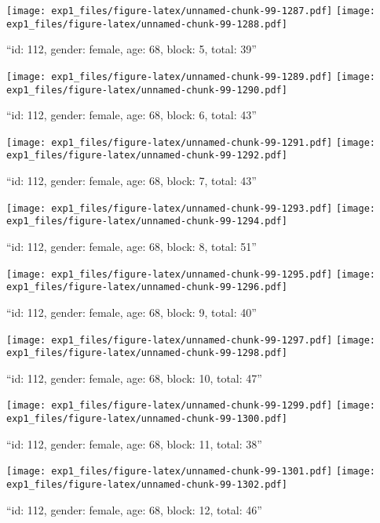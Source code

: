 \documentclass[,]{article}
\begin{document}
\texttt{[image: exp1\_files/figure-latex/unnamed-chunk-99-1287.pdf]}
\texttt{[image: exp1\_files/figure-latex/unnamed-chunk-99-1288.pdf]}

\newpage
[1] 

``id: 112, gender: female, age: 68, block: 5, total: 39''

\texttt{[image: exp1\_files/figure-latex/unnamed-chunk-99-1289.pdf]}
\texttt{[image: exp1\_files/figure-latex/unnamed-chunk-99-1290.pdf]}

\newpage
[1] 

``id: 112, gender: female, age: 68, block: 6, total: 43''

\texttt{[image: exp1\_files/figure-latex/unnamed-chunk-99-1291.pdf]}
\texttt{[image: exp1\_files/figure-latex/unnamed-chunk-99-1292.pdf]}

\newpage
[1] 

``id: 112, gender: female, age: 68, block: 7, total: 43''

\texttt{[image: exp1\_files/figure-latex/unnamed-chunk-99-1293.pdf]}
\texttt{[image: exp1\_files/figure-latex/unnamed-chunk-99-1294.pdf]}

\newpage
[1] 

``id: 112, gender: female, age: 68, block: 8, total: 51''

\texttt{[image: exp1\_files/figure-latex/unnamed-chunk-99-1295.pdf]}
\texttt{[image: exp1\_files/figure-latex/unnamed-chunk-99-1296.pdf]}

\newpage
[1] 

``id: 112, gender: female, age: 68, block: 9, total: 40''

\texttt{[image: exp1\_files/figure-latex/unnamed-chunk-99-1297.pdf]}
\texttt{[image: exp1\_files/figure-latex/unnamed-chunk-99-1298.pdf]}

\newpage
[1] 

``id: 112, gender: female, age: 68, block: 10, total: 47''

\texttt{[image: exp1\_files/figure-latex/unnamed-chunk-99-1299.pdf]}
\texttt{[image: exp1\_files/figure-latex/unnamed-chunk-99-1300.pdf]}

\newpage
[1] 

``id: 112, gender: female, age: 68, block: 11, total: 38''

\texttt{[image: exp1\_files/figure-latex/unnamed-chunk-99-1301.pdf]}
\texttt{[image: exp1\_files/figure-latex/unnamed-chunk-99-1302.pdf]}

\newpage
[1] 

``id: 112, gender: female, age: 68, block: 12, total: 46''
\end{document}
